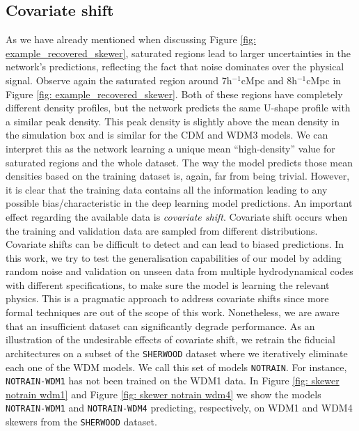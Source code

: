 \subsection{Covariate shift}
As we have already mentioned when discussing Figure \ref{fig: example_recovered_skewer}, saturated regions lead to larger uncertainties in the network's predictions, reflecting the fact that noise dominates over the physical signal. Observe again the saturated region around 7h$^{-1}$cMpc and 8h$^{-1}$cMpc in Figure \ref{fig: example_recovered_skewer}. Both of these regions have completely different density profiles, but the network predicts the same U-shape profile with a similar peak density. This peak density is slightly above the mean density in the simulation box and is similar for the CDM and WDM3 models. We can interpret this as the network learning a unique mean ``high-density'' value for saturated regions and the whole dataset.
The way the model predicts those mean densities based on the training dataset is, again, far from being trivial.
However, it is clear that the training data contains all the information leading to any possible bias/characteristic in the deep learning model predictions. An important effect regarding the available data is \emph{covariate shift}. Covariate shift occurs when the training and validation data are sampled from different distributions. Covariate shifts can be difficult to detect and can lead to biased predictions. In this work, we try to test the generalisation capabilities of our model by adding random noise and validation on unseen data from multiple hydrodynamical codes with different specifications, to make sure the model is learning the relevant physics. This is a pragmatic approach to address covariate shifts since more formal techniques are out of the scope of this work. Nonetheless, we are aware that an insufficient dataset can significantly degrade performance. As an illustration of the undesirable effects of covariate shift, we retrain the fiducial architectures on a subset of the \texttt{SHERWOOD} dataset where we iteratively eliminate each one of the WDM models. We call this set of models \texttt{NOTRAIN}. For instance, \texttt{NOTRAIN-WDM1} has not been trained on the WDM1 data. In Figure \ref{fig: skewer notrain wdm1} and Figure \ref{fig: skewer notrain wdm4} we show the models \texttt{NOTRAIN-WDM1} and \texttt{NOTRAIN-WDM4} predicting, respectively, on WDM1 and WDM4 skewers from the \texttt{SHERWOOD} dataset.

